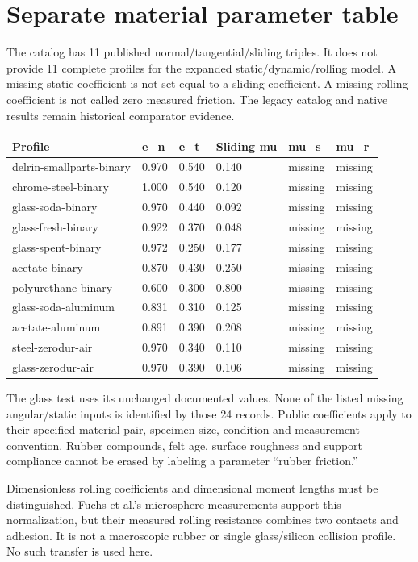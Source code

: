 \documentclass[10pt,a4paper]{article}
\begin{document}
\newpage
\section*{Separate material parameter table}

The catalog has 11 published normal/tangential/sliding triples. It does not provide
11 complete profiles for the expanded static/dynamic/rolling model. A missing static
coefficient is not set equal to a sliding coefficient. A missing rolling coefficient
is not called zero measured friction. The legacy catalog and native results remain
historical comparator evidence.
\begin{center}\footnotesize\setlength{\tabcolsep}{4pt}
\begin{tabular}{llllll}
\hline
Profile & e\_n & e\_t & Sliding mu & mu\_s & mu\_r\\\hline
delrin-smallparts-binary & 0.970 & 0.540 & 0.140 & missing & missing\\
chrome-steel-binary & 1.000 & 0.540 & 0.120 & missing & missing\\
glass-soda-binary & 0.970 & 0.440 & 0.092 & missing & missing\\
glass-fresh-binary & 0.922 & 0.370 & 0.048 & missing & missing\\
glass-spent-binary & 0.972 & 0.250 & 0.177 & missing & missing\\
acetate-binary & 0.870 & 0.430 & 0.250 & missing & missing\\
polyurethane-binary & 0.600 & 0.300 & 0.800 & missing & missing\\
glass-soda-aluminum & 0.831 & 0.310 & 0.125 & missing & missing\\
acetate-aluminum & 0.891 & 0.390 & 0.208 & missing & missing\\
steel-zerodur-air & 0.970 & 0.340 & 0.110 & missing & missing\\
glass-zerodur-air & 0.970 & 0.390 & 0.106 & missing & missing\\
\hline\end{tabular}\end{center}
The glass test uses its unchanged documented values. None of the listed missing
angular/static inputs is identified by those 24 records. Public coefficients apply
to their specified material pair, specimen size, condition and measurement convention.
Rubber compounds, felt age, surface roughness and support compliance cannot be erased
by labeling a parameter ``rubber friction.''

Dimensionless rolling coefficients and dimensional moment lengths must be distinguished.
Fuchs et al.'s microsphere measurements support this normalization, but their measured
rolling resistance combines two contacts and adhesion. It is not a macroscopic rubber
or single glass/silicon collision profile. No such transfer is used here.
\end{document}
